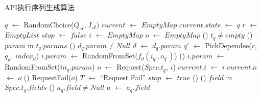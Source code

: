             \begin{algorithm}
              	\scriptsize
              	
                \caption{API执行序列生成算法}
              	
                $q$ $\gets$ RandomChoice($Q_{\mathcal{A}}$, $I_{\mathcal{A}}$)\;
                $current$ $\gets$ $EmptyMap$\;
                $current.state$ $\gets$ $q$\;
                $r$ $\gets$ $EmptyList$\;
                $stop$ $\gets$ $false$\;
                 {
                	$i$ $\gets$ $EmptyMap$\;
                    $o$ $\gets$ $EmptyMap$\;
                	\If() {$t_q \neq empty$}{
                    	\ForEach() {$param$ in $t_q.params$} {
                        	\If() {$d_q.param \neq Null$} {
                            	$d$ $\gets$ $d_q.param$\;
                                $q'$ $\gets$ PickDependee($r$, $q_d$, $index_d$)\;
                                $i.param$ $\gets$ RandomFromSet($f_d(i_{q'}, o_{q'})$)\;
                            } \Else() {
                            	$i.param$ $\gets$ RandomFromSet($in_q.param$)\;
                            }
                        }
                        $o$ $\gets$ Request($Spec.t_q$, $i$)\;
                        $current.i$ $\gets$ $i$\;
                        $current.o$ $\gets$ $o$\;
                        \If() {RequestFail($o$)} {
                        	$T$ $\gets$ ``Request Fail''\;
                            $stop$ $\gets$ $true$\;
                        } \Else() {
                        	\ForEach() {$field$ in $Spec.t_q.fields$} {
                            	\If() {$a_q.field \neq Null$} {
                                	$a$ $\gets$ $a_q.field$\;
}}}}}
\end{algorithm}
